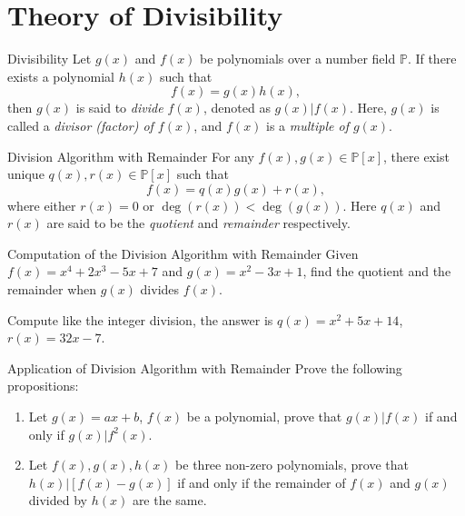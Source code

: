 
\section{Theory of Divisibility}

\begin{definition}{Divisibility}{}
  Let $g(x)$ and $f(x)$ be polynomials over a number field $\mathbb{P}$.
  If there exists a polynomial $h(x)$ such that
  \begin{equation}
    f(x) = g(x) h(x),
  \end{equation}
  then $g(x)$ is said to \emph{divide $f(x)$}, denoted as $g(x)| f(x)$.
  Here, $g(x)$ is called a \emph{divisor (factor) of $f(x)$},
  and $f(x)$ is a \emph{multiple of $g(x)$}.
\end{definition}

\begin{proposition}{Division Algorithm with Remainder}{}
  For any $f(x), g(x) \in \mathbb{P}[x]$,
  there exist unique $q(x), r(x) \in \mathbb{P}[x]$ such that
  \begin{equation}
    f(x) = q(x) g(x) + r(x),
  \end{equation}
  where either $r(x) = 0$ or $\operatorname{deg}(r(x)) < \operatorname{deg} (g(x))$.
  Here $q(x)$ and $r(x)$ are said to be the \emph{quotient} and \emph{remainder} respectively.
\end{proposition}

\begin{example}{Computation of the Division Algorithm with Remainder}{}
  Given $f(x) = x^4 + 2x^3 - 5x + 7$ and $g(x) = x^2 - 3x + 1$,
  find the quotient and the remainder when $g(x)$ divides $f(x)$.
\end{example}

\begin{solution}
  Compute like the integer division, the answer is $q(x) = x^2 + 5x + 14$, $r(x)
  = 32x - 7$.
\end{solution}

\begin{example}{Application of Division Algorithm with Remainder}{}
  Prove the following propositions:
  \begin{enumerate}
  \item Let $g(x) = ax + b$, $f(x)$ be a polynomial, prove that $g(x) | f(x)$ if
    and only if $g(x) | f^2(x)$.
  \item Let $f(x), g(x), h(x)$ be three non-zero polynomials, prove that
    $h(x) | [f(x) - g(x)]$ if and only if the remainder of $f(x)$ and $g(x)$
    divided by $h(x)$ are the same.
  \end{enumerate}
\end{example}

